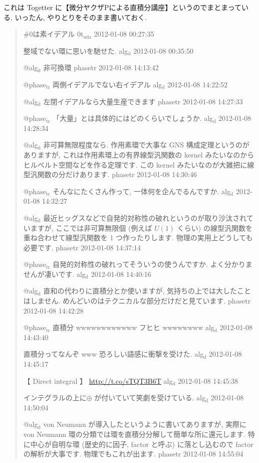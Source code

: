 \documentclass[openany, a4paper, oneside]{jsbook}
\begin{document}
これは Togetter に【微分ヤクザPによる直積分講座】というのでまとまっている.
いったん, やりとりをそのまま書いておく.
\begin{quote}
\#0は素イデアル
0t$_{\text{uda}}$ 2012-01-08 00:27:35

整域でない環に思いを馳せた.
alg$_{\text{d}}$ 2012-01-08 00:35:50

@alg$_{\text{d}}$ 非可換環
phasetr 2012-01-08 14:13:42

@phase$_{\text{tr}}$ 両側イデアルでない右イデアル
alg$_{\text{d}}$ 2012-01-08 14:22:52

@alg$_{\text{d}}$ 左閉イデアルなら大量生産できます
phasetr 2012-01-08 14:27:33

@phase$_{\text{tr}}$ 「大量」とは具体的にはどのくらいでしょうか.
alg$_{\text{d}}$ 2012-01-08 14:28:34

@alg$_{\text{d}}$ 非可算無限程度なら. 作用素環で大事な GNS 構成定理というのがありますが,
これは作用素環上の有界線型汎関数の kernel みたいなのからヒルベルト空間などを作る定理です.
この kernel みたいなのが大雑把に線型汎関数の分だけあります.
phasetr 2012-01-08 14:30:46

@phase$_{\text{tr}}$ そんなにたくさん作って, 一体何を企んでるんですか.
alg$_{\text{d}}$ 2012-01-08 14:32:27

@alg$_{\text{d}}$ 最近ヒッグスなどで自発的対称性の破れというのが取り沙汰されていますが,
ここでは非可算無限個 (例えば $U (1)$ くらい) の線型汎関数を重ね合わせて線型汎関数を 1 つ作ったりします.
物理の実用上どうしても必要です.
phasetr 2012-01-08 14:37:14

@phase$_{\text{tr}}$ 自発的対称性の破れってそういうの使うんですか. よく分かりませんが凄いです.
alg$_{\text{d}}$ 2012-01-08 14:40:16

@alg$_{\text{d}}$ 直和の代わりに直積分とか使いますが, 気持ちの上では大したことはしません.
めんどいのはテクニカルな部分だけだと見ています.
phasetr 2012-01-08 14:42:28

@phase$_{\text{tr}}$ 直積分 wwwwwwwwwwww フヒヒ wwwwwwww
alg$_{\text{d}}$ 2012-01-08 14:43:40

直積分ってなんぞ www 恐ろしい語感に衝撃を受けた.
alg$_{\text{d}}$ 2012-01-08 14:45:17

【 Direct integral 】
\url{http://t.co/sTQT3B6T}
alg$_{\text{d}}$ 2012-01-08 14:45:38

インテグラルの上に$\oplus$ が付いていて笑劇を受けている.
alg$_{\text{d}}$ 2012-01-08 14:50:04

@alg$_{\text{d}}$ von Neumann が導入したというように書いてありますが,
実際に von Neumann 環の分類では環を直積分分解して簡単な所に還元します.
特に中心が自明な環 (歴史的に因子, factor と呼ぶ) に落とし込むので factor の解析が大事です.
物理でもこれが出ます.
phasetr 2012-01-08 14:55:04


\end{quote}
\end{document}
